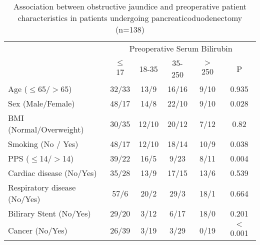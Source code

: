 \begin{table}[p]

\caption{Association between obstructive jaundice and preoperative patient characteristics in patients undergoing pancreaticoduodenectomy  (n=138)}
\label{table:cpet_oj_table1}

\centering\renewcommand{\arraystretch}{1.4} %


	\begin{tabular}{l c c c c c}
		\hline
		                             & \multicolumn{5}{c}{Preoperative Serum Bilirubin} \\
		                             & $\leq$ 17 & 18-35 & 35-250 & $>$ 250 & P         \\ \hline
		Age ($\leq$65/$>$65)         & 32/33     & 13/9  & 16/16  & 9/10    & 0.935     \\
		Sex (Male/Female)            & 48/17     & 14/8  & 22/10  & 9/10    & 0.028     \\
		BMI (Normal/Overweight)      & 30/35     & 12/10 & 20/12  & 7/12    & 0.82      \\
		Smoking (No / Yes)           & 48/17     & 12/10 & 18/14  & 10/9    & 0.038     \\
		PPS ($\leq$14/$>$14)         & 39/22     & 16/5  & 9/23   & 8/11    & 0.004     \\
		Cardiac disease (No/Yes)     & 35/28     & 13/9  & 17/15  & 13/6    & 0.539     \\
		Respiratory disease (No/Yes) & 57/6      & 20/2  & 29/3   & 18/1    & 0.664     \\
		Bilirary Stent (No/Yes)      & 29/20     & 3/12  & 6/17   & 18/0    & 0.201     \\
		Cancer (No/Yes)              & 26/39     & 3/19  & 3/29   & 0/19    & $<$0.001  \\ \hline
	\end{tabular}

\end{table}